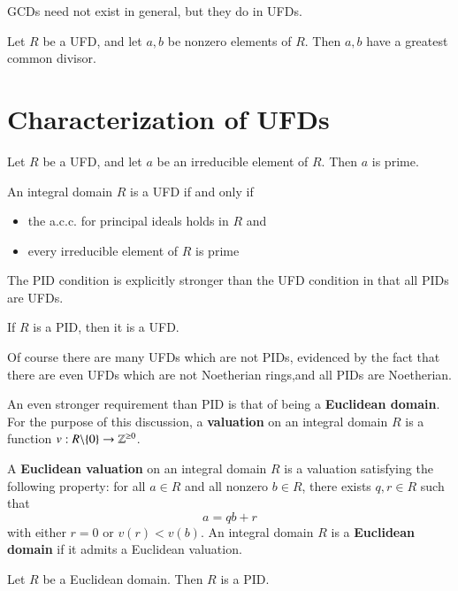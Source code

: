 \documentclass[12pt, a4paper, oneside, openright, titlepage]{book}
\begin{document}
GCDs need not exist in general, but they do in UFDs.

\begin{lem}
    Let $R$ be a UFD, and let $a,b$ be nonzero elements of $R$. Then $a,b$ have a greatest common divisor.
\end{lem}


\section{Characterization of UFDs}

\begin{lem}
    Let $R$ be a UFD, and let $a$ be an irreducible element of $R$. Then $a$ is prime.
\end{lem}

\begin{thm}
    An integral domain $R$ is a UFD if and only if \begin{itemize}
        \item the a.c.c. for principal ideals holds in $R$ and 
        \item every irreducible element of $R$ is prime
    \end{itemize}
\end{thm}

The PID condition is explicitly stronger than the UFD condition in that all PIDs are UFDs.

\begin{prop}
    If $R$ is a PID, then it is a UFD.
\end{prop}

Of course there are many UFDs which are not PIDs, evidenced by the fact that there are even UFDs which are not Noetherian rings,and all PIDs are Noetherian.

An even stronger requirement than PID is that of being a \textbf{Euclidean domain}. For the purpose of this discussion, a \textbf{valuation} on an integral domain $R$ is a function $v:R\backslash\{0\}\rightarrow \mathbb Z^{\geq 0}$.

\begin{defn}
    A \textbf{Euclidean valuation} on an integral domain $R$ is a valuation satisfying the following property: for all $a \in R$ and all nonzero $b \in R$, there exists $q,r \in R$ such that $$a  =qb+r$$
    with either $r = 0$ or $v(r) < v(b)$. An integral domain $R$ is a \textbf{Euclidean domain} if it admits a Euclidean valuation.
\end{defn}

\begin{prop}
    Let $R$ be a Euclidean domain. Then $R$ is a PID.
\end{prop}
\end{document}
